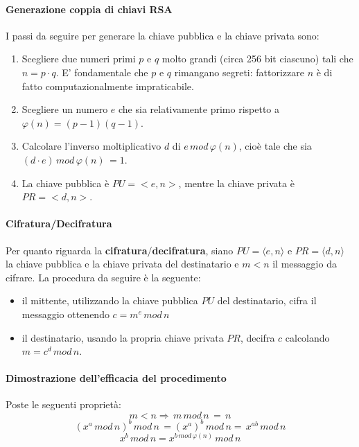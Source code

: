 \paragraph{Generazione coppia di chiavi RSA}
I passi da seguire per generare la chiave pubblica e la chiave privata sono: 
\begin{enumerate}
\item Scegliere due numeri primi $p$ e $q$ molto grandi (circa 256 bit ciascuno) tali che $n = p \cdot q$. E' fondamentale che $p$ e $q$ rimangano segreti: fattorizzare $n$ è di fatto computazionalmente impraticabile. 
\item Scegliere un numero $e$ che sia relativamente primo rispetto a $\varphi(n) = (p-1)(q-1)$.
\item Calcolare l'inverso moltiplicativo $d$ di $e \, mod \, \varphi(n)$, cioè tale che sia $(d \cdot e ) \, mod \, \varphi(n) \, = 1$.
\item La chiave pubblica è $PU = <e,n>$, mentre la chiave privata è $PR = <d,n>$.
\end{enumerate}

\paragraph{Cifratura/Decifratura}
Per quanto riguarda la \textbf{cifratura}/\textbf{decifratura}, siano $PU = \langle e,n \rangle$ e $PR = \langle d,n \rangle$ la chiave pubblica e la chiave privata del destinatario e $m < n$ il messaggio da cifrare. La procedura da seguire è la seguente: 
\begin{itemize}
\item il mittente, utilizzando la chiave pubblica $PU$ del destinatario, cifra il messaggio ottenendo $c = m^e \, mod \, n$
\item il destinatario, usando la propria chiave privata $PR$, decifra $c$ calcolando $m = c^d \, mod \, n$. \end{itemize}

\paragraph{Dimostrazione dell'efficacia del procedimento}
Poste le seguenti proprietà: 
\begin{equation}\label{eq:eff_1}
m<n \Rightarrow \, m \, mod \, n\,=\,n
\end{equation}
\begin{equation} \label{eq:eff_2}
(x^a \, mod \, n)^b \, mod \, n \, =  (x^{a})^b \, mod \, n =  \, x^{ab} \, mod \, n
\end{equation}
\begin{equation} \label{eq:eff_3}
	x^{b} \, mod \, n = x^{b \, mod \, \varphi(n)} \, mod \, n
\end{equation}

